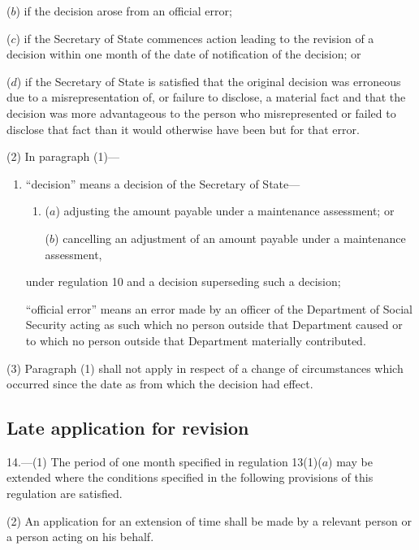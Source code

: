 \documentclass[12pt,a4paper]{article}
\begin{document}
{\begin{enumerate}
($b$) if the decision arose from an official error;

($c$) if the Secretary of State commences action leading to the revision of a decision within one month of the date of notification of the decision; or

($d$) if the Secretary of State is satisfied that the original decision was erroneous due to a misrepresentation of, or failure to disclose, a material fact and that the decision was more advantageous to the person who misrepresented or failed to disclose that fact than it would otherwise have been but for that error.
\end{enumerate}

(2) In paragraph (1)—
\begin{enumerate}\item[]
    “decision” means a decision of the Secretary of State—
\begin{enumerate}\item[]
    ($a$)
    adjusting the amount payable under a maintenance assessment; or

    ($b$)
    cancelling an adjustment of an amount payable under a maintenance assessment,
\end{enumerate}
    under regulation 10 and a decision superseding such a decision;

    “official error” means an error made by an officer of the Department of Social Security acting as such which no person outside that Department caused or to which no person outside that Department materially contributed. 
\end{enumerate}

(3) Paragraph (1) shall not apply in respect of a change of circumstances which occurred since the date as from which the decision had effect.


\subsection[14. Late application for revision]{Late application for revision}

14.—(1) The period of one month specified in regulation 13(1)($a$) may be extended where the conditions specified in the following provisions of this regulation are satisfied.

(2) An application for an extension of time shall be made by a relevant person or a person acting on his behalf.

}
\end{document}
